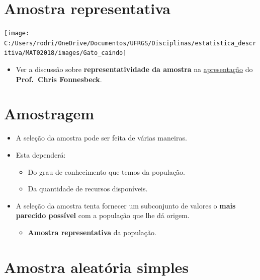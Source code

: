 \documentclass[]{tufte-book}
\providecommand{\tightlist}{%
  \setlength{\itemsep}{0pt}\setlength{\parskip}{0pt}}
\begin{document}
\hypertarget{amostra-representativa}{%
\section{Amostra representativa}\label{amostra-representativa}}

\begin{center}\texttt{[image: C:/Users/rodri/OneDrive/Documentos/UFRGS/Disciplinas/estatistica\_descritiva/MAT02018/images/Gato\_caindo]} \end{center}

\begin{itemize}
\tightlist
\item
  Ver a discussão sobre \textbf{representatividade da amostra} na
  \href{https://www.youtube.com/watch?v=TGGGDpb04Yc\&t=592s}{apresentação}
  do \textbf{Prof.~Chris Fonnesbeck}.
\end{itemize}

\hypertarget{amostragem}{%
\section{Amostragem}\label{amostragem}}

\begin{itemize}
\tightlist
\item
  A seleção da amostra pode ser feita de várias maneiras.
\item
  Esta dependerá:

  \begin{itemize}
  \tightlist
  \item
    Do grau de conhecimento que temos da população.
  \item
    Da quantidade de recursos disponíveis.
  \end{itemize}
\item
  A seleção da amostra tenta fornecer um subconjunto de valores o
  \textbf{mais parecido possível} com a população que lhe dá origem.

  \begin{itemize}
  \tightlist
  \item
    \textbf{Amostra representativa} da população.
  \end{itemize}
\end{itemize}

\hypertarget{amostra-aleatuxf3ria-simples}{%
\section{Amostra aleatória simples}\label{amostra-aleatuxf3ria-simples}}
\end{document}
